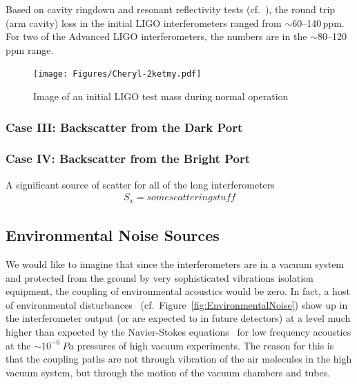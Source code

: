 Based on cavity ringdown and resonant reflectivity tests (cf.~\cite{Isogai2013}),
the round trip (arm cavity) loss in the initial LIGO interferometers ranged from
$\sim$60--140\,ppm. For two of the Advanced LIGO interferometers, the numbers
are in the $\sim$80--120\,ppm range.

\begin{figure}[h]
  \centering
    \texttt{[image: Figures/Cheryl-2ketmy.pdf]}
    \caption{Image of an initial LIGO test mass during normal operation}
    \label{fig:2kETMy}
\end{figure}

\subsubsection{Case III: Backscatter from the Dark Port}


\subsubsection{Case IV: Backscatter from the Bright Port}



A significant source of scatter for all of the long interferometers
\begin{align}
S_x = some scattering stuff
\end{align}

\subsection{Environmental Noise Sources}
\label{s:IDC:PEM}
We would like to imagine that since the interferometers are in a vacuum system and
protected from the ground by very sophisticated vibrations isolation equipment,
the coupling of environmental acoustics would be zero. In fact, a host of environmental
disturbances~\cite{Effler:2015hw, Acernese:2006dq} (cf.~Figure~\ref{fig:EnvironmentalNoise})
show up in the interferometer output (or are expected to in future detectors)
at a level much higher than expected by the Navier-Stokes
equations~\cite{Greenspan:sound} for low frequency acoustics at the $\sim10^{-6}~Pa$
pressures of high vacuum experiments. The reason for this is that the coupling
paths are not through vibration of the air molecules in the high vacuum system,
but through the motion of the vacuum chambers and tubes.




